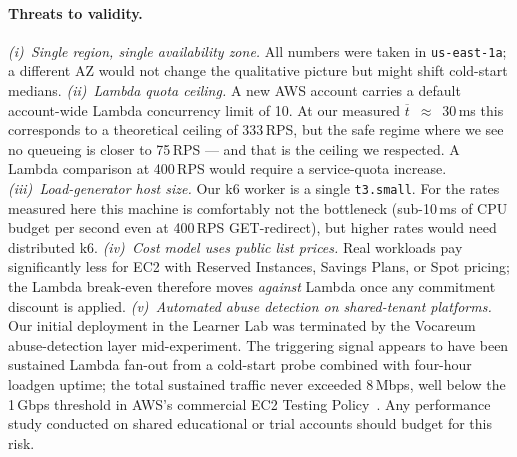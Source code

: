 \paragraph{Threats to validity.}
\textit{(i)~Single region, single availability zone.} All numbers were
taken in \texttt{us-east-1a}; a different AZ would not change the
qualitative picture but might shift cold-start medians.
\textit{(ii)~Lambda quota ceiling.} A new AWS account carries a default
account-wide Lambda concurrency limit of 10. At our measured
$\overline{t}$~$\approx$~30\,ms this corresponds to a theoretical
ceiling of 333\,RPS, but the safe regime where we see no queueing is
closer to 75\,RPS --- and that is the ceiling we respected. A Lambda
comparison at 400\,RPS would require a service-quota increase.
\textit{(iii)~Load-generator host size.} Our k6 worker is a single
\texttt{t3.small}. For the rates measured here this machine is
comfortably not the bottleneck (sub-10\,ms of CPU budget per second
even at 400\,RPS GET-redirect), but higher rates would need
distributed k6.
\textit{(iv)~Cost model uses public list prices.} Real workloads pay
significantly less for EC2 with Reserved Instances, Savings Plans, or
Spot pricing; the Lambda break-even therefore moves \emph{against}
Lambda once any commitment discount is applied.
\textit{(v)~Automated abuse detection on shared-tenant platforms.}
Our initial deployment in the Learner Lab was terminated by the
Vocareum abuse-detection layer mid-experiment. The triggering signal
appears to have been sustained Lambda fan-out from a cold-start probe
combined with four-hour loadgen uptime; the total sustained traffic
never exceeded 8\,Mbps, well below the 1\,Gbps threshold in AWS's
commercial EC2 Testing Policy~\cite{awsec2test}. Any performance study
conducted on shared educational or trial accounts should budget for
this risk.
